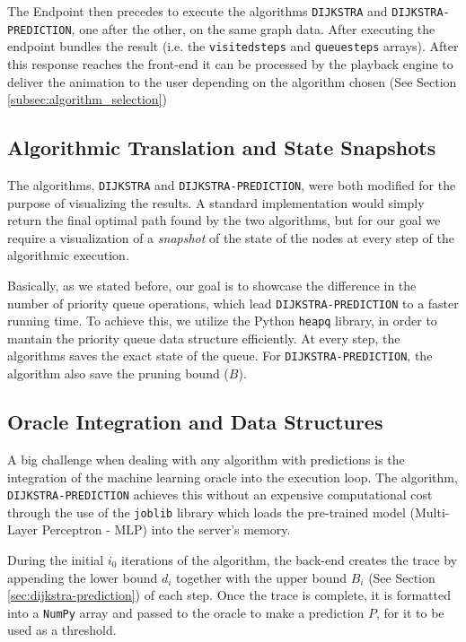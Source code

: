 The Endpoint then precedes to execute the algorithms \texttt{DIJKSTRA} and \texttt{DIJKSTRA-PREDICTION}, one after the other, on the same graph data. After executing the endpoint bundles the result (i.e. the \texttt{visited\-steps} and \texttt{queue\-steps} arrays). After this response reaches the front-end it can be processed by the playback engine to deliver the animation to the user depending on the algorithm chosen (See Section \ref{subsec:algorithm_selection})

\subsection{Algorithmic Translation and State Snapshots}
\label{subsec:state_snapshots}
The algorithms, \texttt{DIJKSTRA} and \texttt{DIJKSTRA-PREDICTION}, were both modified for the purpose of visualizing the results. A standard implementation would simply return the final optimal path found by the two algorithms, but for our goal we require a visualization of a \textit{snapshot} of the state of the nodes at every step of the algorithmic execution. 

Basically, as we stated before, our goal is to showcase the difference in the number of priority queue operations, which lead \texttt{DIJKSTRA-PREDICTION} to a faster running time. To achieve this, we utilize the Python \texttt{heapq} library, in order to mantain the priority queue data structure efficiently. At every step, the algorithms saves the exact state of the queue. For \texttt{DIJKSTRA-PREDICTION}, the algorithm also save the pruning bound ($B$).

\subsection{Oracle Integration and Data Structures}
\label{subsec:oracle_integration}

A big challenge when dealing with any algorithm with predictions is the integration of the machine learning oracle into the execution loop. The algorithm, \texttt{DIJKSTRA-PREDICTION} achieves this without an expensive computational cost through the use of the \texttt{joblib} library which loads the pre-trained model (Multi-Layer Perceptron - MLP) into the server's memory.

During the initial $i_0$ iterations of the algorithm, the back-end creates the trace by appending the lower bound $d_i$ together with the upper bound $B_i$ (See Section \ref{sec:dijkstra-prediction}) of each step. Once the trace is complete, it is formatted into a \texttt{NumPy} array and passed to the oracle to make a prediction $P$, for it to be used as a threshold. 

